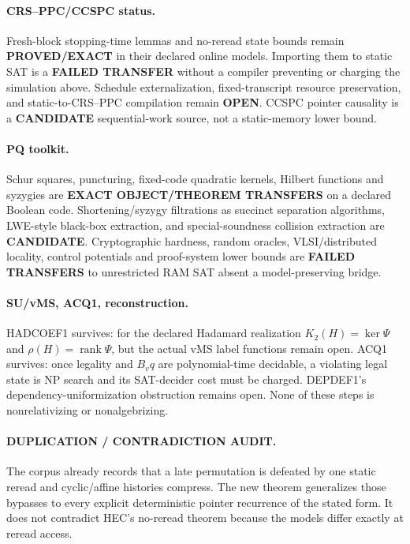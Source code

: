 \documentclass[11pt]{article}
\begin{document}
\paragraph{CRS--PPC/CCSPC status.} Fresh-block stopping-time lemmas and no-reread state bounds remain \textbf{PROVED/EXACT} in their declared online models. Importing them to static SAT is a \textbf{FAILED TRANSFER} without a compiler preventing or charging the simulation above. Schedule externalization, fixed-transcript resource preservation, and static-to-CRS--PPC compilation remain \textbf{OPEN}. CCSPC pointer causality is a \textbf{CANDIDATE} sequential-work source, not a static-memory lower bound.

\paragraph{PQ toolkit.} Schur squares, puncturing, fixed-code quadratic kernels, Hilbert functions and syzygies are \textbf{EXACT OBJECT/THEOREM TRANSFERS} on a declared Boolean code. Shortening/syzygy filtrations as succinct separation algorithms, LWE-style black-box extraction, and special-soundness collision extraction are \textbf{CANDIDATE}. Cryptographic hardness, random oracles, VLSI/distributed locality, control potentials and proof-system lower bounds are \textbf{FAILED TRANSFERS} to unrestricted RAM SAT absent a model-preserving bridge.

\paragraph{SU/vMS, ACQ1, reconstruction.} HADCOEF1 survives: for the declared Hadamard realization $K_2(H)=\ker\Psi$ and $\rho(H)=\operatorname{rank}\Psi$, but the actual vMS label functions remain open. ACQ1 survives: once legality and $B_vq$ are polynomial-time decidable, a violating legal state is NP search and its SAT-decider cost must be charged. DEPDEF1's dependency-uniformization obstruction remains open. None of these steps is nonrelativizing or nonalgebrizing.

\paragraph{DUPLICATION / CONTRADICTION AUDIT.} The corpus already records that a late permutation is defeated by one static reread and cyclic/affine histories compress. The new theorem generalizes those bypasses to every explicit deterministic pointer recurrence of the stated form. It does not contradict HEC's no-reread theorem because the models differ exactly at reread access.
\end{document}
